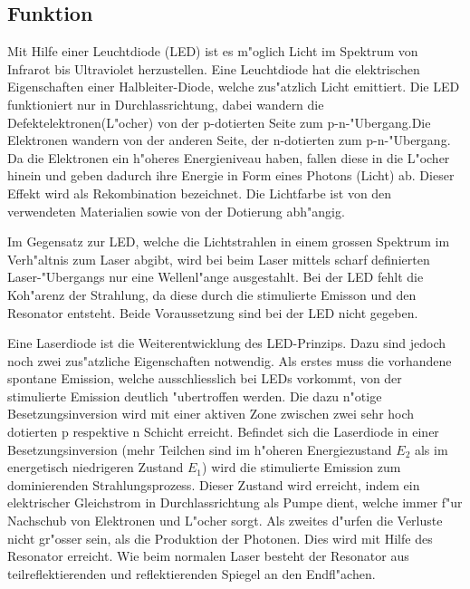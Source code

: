 \begin{refsection}
\subsection{Funktion}
Mit Hilfe einer Leuchtdiode (LED) ist es m"oglich Licht im Spektrum von 
Infrarot bis Ultraviolet herzustellen. Eine Leuchtdiode hat die elektrischen 
Eigenschaften einer Halbleiter-Diode, welche zus"atzlich Licht emittiert. Die 
LED funktioniert nur in Durchlassrichtung, dabei wandern die 
Defektelektronen(L"ocher) von der p-dotierten Seite zum p-n-"Ubergang.Die 
Elektronen wandern von der anderen Seite, der n-dotierten zum p-n-"Ubergang. 
Da die Elektronen ein h"oheres Energieniveau haben, fallen diese in die 
L"ocher hinein und geben dadurch ihre Energie in Form eines Photons (Licht) 
ab. Dieser Effekt wird als Rekombination bezeichnet. Die Lichtfarbe ist von 
den verwendeten Materialien sowie von der Dotierung abh"angig.

Im Gegensatz zur LED, welche die Lichtstrahlen in einem grossen Spektrum im 
Verh"altnis zum Laser abgibt, wird bei beim Laser mittels scharf definierten 
Laser-"Ubergangs nur eine Wellenl"ange ausgestahlt.  
Bei der LED fehlt die Koh"arenz der Strahlung, da 
diese durch die stimulierte Emisson und den Resonator entsteht. Beide 
Voraussetzung sind bei der LED nicht gegeben. 

Eine Laserdiode ist die Weiterentwicklung des LED-Prinzips. Dazu sind jedoch 
noch zwei zus"atzliche Eigenschaften notwendig. Als erstes muss die vorhandene 
spontane Emission, welche ausschliesslich bei LEDs vorkommt, von der 
stimulierte Emission deutlich "ubertroffen werden. Die dazu n"otige 
Besetzungsinversion wird mit einer aktiven Zone zwischen zwei sehr hoch 
dotierten p respektive n Schicht erreicht. Befindet sich die Laserdiode in 
einer Besetzungsinversion (mehr Teilchen sind im h"oheren Energiezustand $E_2$ 
als im energetisch niedrigeren Zustand $E_1$) wird die stimulierte Emission zum 
dominierenden Strahlungsprozess. Dieser Zustand wird erreicht, indem ein 
elektrischer Gleichstrom in Durchlassrichtung als Pumpe dient, welche immer 
f"ur Nachschub von Elektronen und L"ocher sorgt. Als zweites d"urfen die 
Verluste nicht gr"osser sein, als die Produktion der Photonen.
Dies wird mit Hilfe des Resonator erreicht.
Wie beim normalen Laser besteht der Resonator aus teilreflektierenden 
und reflektierenden Spiegel an den Endfl"achen.


\end{refsection}

